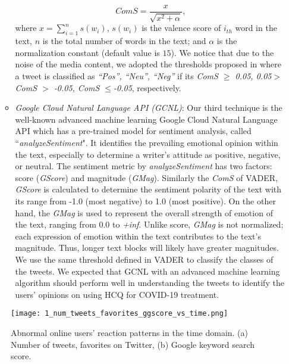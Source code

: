 \documentclass[conference]{IEEEtran}
\begin{document}
\begin{itemize}
\begin{itemize}
			\begin{equation}
				ComS = \frac{x}{\sqrt{x^2 + \alpha}},
			\end{equation}
			where  $x= \sum_{i=1}^{n}s(w_i)$, $s(w_i)$ is the valence score of $i_{th}$ word in the text, $n$ is the total number of words in the text; and $\alpha$ is the normalization constant (default value is $15$). We notice that due to the noise of the media content, we adopted the thresholds proposed in \cite{b10}\cite{b11} where a tweet is classified as \textit {``Pos'', ``Neu'', ``Neg''} if its \textit{ComS $\geq$ 0.05, 0.05$>$ ComS $>$ -0.05, ComS $\leq$-0.05}, respectively. 
			\item {\it Google Cloud Natural Language API (GCNL)}: Our third technique is the well-known advanced machine learning Google Cloud Natural Language API \cite{b13} which has a pre-trained model for sentiment analysis, called ``{\it analyzeSentiment}". It identifies the prevailing emotional opinion within the text, especially to determine a writer's attitude as positive, negative, or neutral. The sentiment metric by {\it analyzeSentiment} has two factors: score (\textit{GScore}) and magnitude (\textit{GMag}). Similarly the \textit{ComS} of VADER, \textit{GScore} is calculated to determine the sentiment polarity of the text with its range from -1.0 (most negative) to 1.0 (most positive). On the other hand, the \textit{GMag} is used to represent the overall strength of emotion of the text, ranging from 0.0 to \textit{+inf}. Unlike score, \textit{GMag} is not normalized; each expression of emotion within the text contributes to the text's magnitude. Thus, longer text blocks will likely have greater magnitudes. We use the same threshold defined in VADER to classify the classes of the tweets. We expected that GCNL with an advanced machine learning algorithm should perform well in understanding the tweets to identify the users' opinions on using HCQ for COVID-19 treatment.
			
		\end{itemize}
	\end{itemize}
	
	\begin{figure}[tb]
		\centering 
		\texttt{[image: 1\_num\_tweets\_favorites\_ggscore\_vs\_time.png]} 
		\caption{Abnormal online users' reaction patterns in the time domain. (a) Number of tweets, favorites on Twitter, (b) Google keyword search score.}
		\label{fig:1_num_tweets_favorites_ggscore_vs_time} 
		\vspace{-0.15in}
	\end{figure}
	
\end{document}

